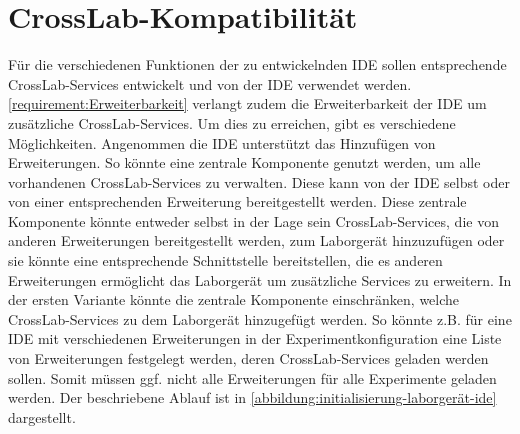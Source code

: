 \section{CrossLab-Kompatibilität}\label{section:konzeption:crosslab-kompatibilität}


Für die verschiedenen Funktionen der zu entwickelnden IDE sollen entsprechende CrossLab-Services entwickelt und von der IDE verwendet werden. \autoref{requirement:Erweiterbarkeit} verlangt zudem die Erweiterbarkeit der IDE um zusätzliche CrossLab-Services. Um dies zu erreichen, gibt es verschiedene Möglichkeiten. Angenommen die IDE unterstützt das Hinzufügen von Erweiterungen. So könnte eine zentrale Komponente genutzt werden, um alle vorhandenen CrossLab-Services zu verwalten. Diese kann von der IDE selbst oder von einer entsprechenden Erweiterung bereitgestellt werden. Diese zentrale Komponente könnte entweder selbst in der Lage sein CrossLab-Services, die von anderen Erweiterungen bereitgestellt werden, zum Laborgerät hinzuzufügen oder sie könnte eine entsprechende Schnittstelle bereitstellen, die es anderen Erweiterungen ermöglicht das Laborgerät um zusätzliche Services zu erweitern. In der ersten Variante könnte die zentrale Komponente einschränken, welche CrossLab-Services zu dem Laborgerät hinzugefügt werden. So könnte z.B. für eine IDE mit verschiedenen Erweiterungen in der Experimentkonfiguration eine Liste von Erweiterungen festgelegt werden, deren CrossLab-Services geladen werden sollen. Somit müssen ggf. nicht alle Erweiterungen für alle Experimente geladen werden. Der beschriebene Ablauf ist in \autoref{abbildung:initialisierung-laborgerät-ide} dargestellt.

